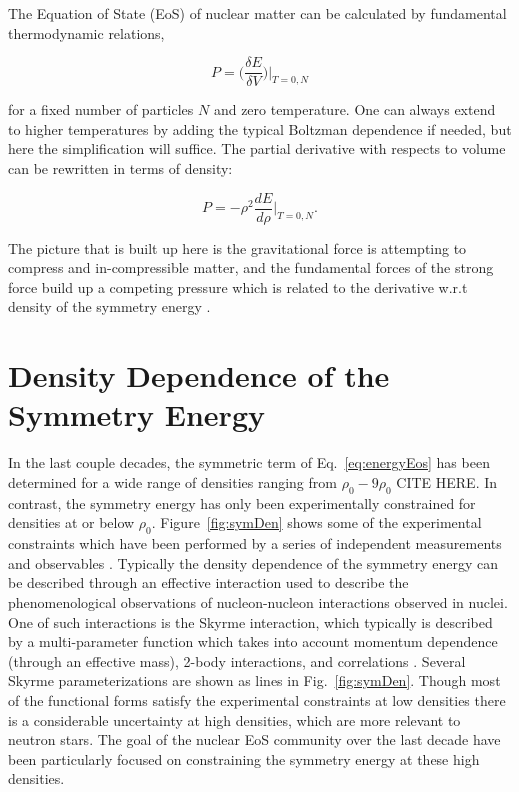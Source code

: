 The Equation of State (EoS) of nuclear matter can be calculated by fundamental thermodynamic relations, 

\begin{equation}
P = \Big(\frac{\delta E}{\delta V}\Big)\vert_{T=0,N}
\label{eq:pressEos}
\end{equation}

for a fixed number of particles $N$ and zero temperature. One can always extend to higher temperatures by adding the typical Boltzman dependence if needed, but here the simplification will suffice. The partial derivative with respects to volume can be rewritten in terms of density:

\begin{equation}
P = -\rho^2 \frac{dE}{d\rho}\vert_{T=0,N}.
\label{eq:densEos}
\end{equation}

The picture that is built up here is the gravitational force is attempting to compress and in-compressible matter, and the fundamental forces of the strong force build up a competing pressure which is related to the derivative w.r.t density of the symmetry energy \cite{tovEq}.  

\section{Density Dependence of the Symmetry Energy}
In the last couple decades, the symmetric term of Eq.~\ref{eq:energyEos} has been determined for a wide range of densities ranging from $\rho_0 - 9\rho_0$ CITE HERE. In contrast, the symmetry energy has only been experimentally constrained for densities at or below $\rho_0$. Figure~\ref{fig:symDen} shows some of the experimental constraints which have been performed by a series of independent measurements and observables \cite{awayforward}. Typically the density dependence of the symmetry energy can be described through an effective interaction used to describe the phenomenological observations of nucleon-nucleon interactions observed in nuclei. One of such interactions is the Skyrme interaction, which typically is described by a multi-parameter function which takes into account momentum dependence (through an effective mass), 2-body interactions, and correlations \cite{skyrme}. Several Skyrme parameterizations are shown as lines in Fig.~\ref{fig:symDen}. Though most of the functional forms satisfy the experimental constraints at low densities there is a considerable uncertainty at high densities, which are more relevant to neutron stars. The goal of the nuclear EoS community over the last decade have been particularly focused on constraining the symmetry energy at these high densities. 





